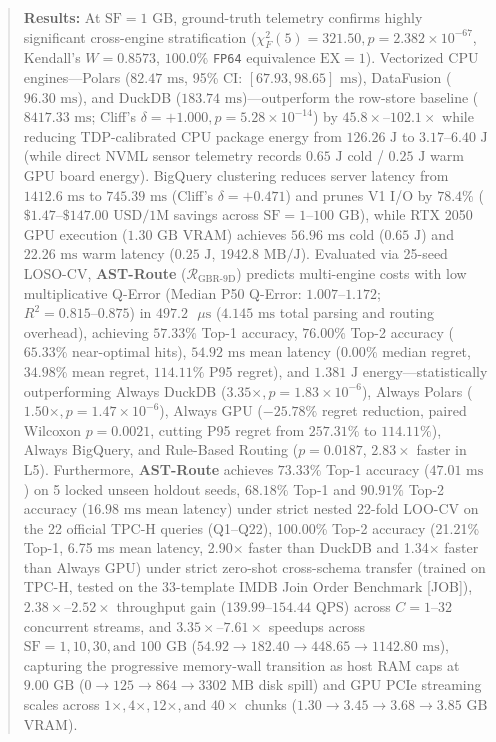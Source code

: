 \documentclass[10pt,a4paper]{article}
\begin{document}
\begin{quote}
\textbf{Results:} At $\text{SF}=1\text{ GB}$, ground-truth telemetry confirms highly significant cross-engine stratification ($\chi^2_F(5) = 321.50, p = 2.382 \times 10^{-67}$, Kendall's $W = 0.8573$, $100.0\%$ \texttt{FP64} equivalence $\text{EX}=1$). Vectorized CPU engines---Polars ($82.47\text{ ms}$, 95\% CI: $[67.93, 98.65]\text{ ms}$), DataFusion ($96.30\text{ ms}$), and DuckDB ($183.74\text{ ms}$)---outperform the row-store baseline ($8417.33\text{ ms}$; Cliff's $\delta = +1.000, p = 5.28 \times 10^{-14}$) by $45.8\times\text{--}102.1\times$ while reducing TDP-calibrated CPU package energy from $126.26\text{ J}$ to $3.17\text{--}6.40\text{ J}$ (while direct NVML sensor telemetry records $0.65\text{ J}$ cold / $0.25\text{ J}$ warm GPU board energy). BigQuery clustering reduces server latency from $1412.6\text{ ms}$ to $745.39\text{ ms}$ (Cliff's $\delta = +0.471$) and prunes V1 I/O by $78.4\%$ ($\$1.47\text{--}\$147.00\text{ USD/1M}$ savings across $\text{SF}=1\text{--}100\text{ GB}$), while RTX 2050 GPU execution ($1.30\text{ GB}$ VRAM) achieves $56.96\text{ ms}$ cold ($0.65\text{ J}$) and $22.26\text{ ms}$ warm latency ($0.25\text{ J}$, $1942.8\text{ MB/J}$). Evaluated via 25-seed LOSO-CV, \textbf{AST-Route} ($\mathcal{R}_{\text{GBR-9D}}$) predicts multi-engine costs with low multiplicative Q-Error (Median P50 Q-Error: $1.007\text{--}1.172$; $R^2 = 0.815\text{--}0.875$) in $497.2\text{ }\mu\text{s}$ ($4.145\text{ ms}$ total parsing and routing overhead), achieving $57.33\%$ Top-1 accuracy, $76.00\%$ Top-2 accuracy ($65.33\%$ near-optimal hits), $54.92\text{ ms}$ mean latency ($0.00\%$ median regret, $34.98\%$ mean regret, $114.11\%$ P95 regret), and $1.381\text{ J}$ energy---statistically outperforming Always DuckDB ($3.35\times, p=1.83\times 10^{-6}$), Always Polars ($1.50\times, p=1.47\times 10^{-6}$), Always GPU ($-25.78\%$ regret reduction, paired Wilcoxon $p=0.0021$, cutting P95 regret from $257.31\%$ to $114.11\%$), Always BigQuery, and Rule-Based Routing ($p = 0.0187$, $2.83\times$ faster in L5). Furthermore, \textbf{AST-Route} achieves $73.33\%$ Top-1 accuracy ($47.01\text{ ms}$) on 5 locked unseen holdout seeds, $68.18\%$ Top-1 and $90.91\%$ Top-2 accuracy ($16.98\text{ ms}$ mean latency) under strict nested 22-fold LOO-CV on the 22 official TPC-H queries (Q1--Q22), 100.00\% Top-2 accuracy (21.21\% Top-1, 6.75 ms mean latency, 2.90$\times$ faster than DuckDB and 1.34$\times$ faster than Always GPU) under strict zero-shot cross-schema transfer (trained on TPC-H, tested on the 33-template IMDB Join Order Benchmark [JOB]), $2.38\times\text{--}2.52\times$ throughput gain ($139.99\text{--}154.44\text{ QPS}$) across $C=1\text{--}32$ concurrent streams, and $3.35\times\text{--}7.61\times$ speedups across $\text{SF}=1, 10, 30, \text{and } 100\text{ GB}$ ($54.92 \rightarrow 182.40 \rightarrow 448.65 \rightarrow 1142.80\text{ ms}$), capturing the progressive memory-wall transition as host RAM caps at $9.00\text{ GB}$ ($0 \rightarrow 125 \rightarrow 864 \rightarrow 3302\text{ MB}$ disk spill) and GPU PCIe streaming scales across $1\times, 4\times, 12\times, \text{and } 40\times$ chunks ($1.30 \rightarrow 3.45 \rightarrow 3.68 \rightarrow 3.85\text{ GB}$ VRAM).\\[0.25em]

\end{quote}
\end{document}
